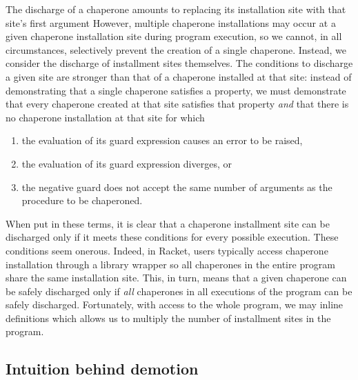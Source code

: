 \documentclass{sigplanconf}
\begin{document}
The discharge of a chaperone amounts to replacing its installation site with that site's first argument
However, multiple chaperone installations may occur at a given chaperone installation site during program execution, so we cannot, in all circumstances, selectively prevent the creation of a single chaperone.
Instead, we consider the discharge of installment sites themselves.
The conditions to discharge a given site are stronger than that of a chaperone installed at that site: instead of demonstrating that a single chaperone satisfies a property, we must demonstrate that every chaperone created at that site satisfies that property \emph{and} that there is no chaperone installation at that site for which
\begin{enumerate}
\item the evaluation of its guard expression causes an error to be raised,
\item the evaluation of its guard expression diverges, or
\item the negative guard does not accept the same number of arguments as the procedure to be chaperoned.
\end{enumerate}

When put in these terms, it is clear that a chaperone installment site can be discharged only if it meets these conditions for every possible execution.
These conditions seem onerous.
Indeed, in Racket, users typically access chaperone installation through a library wrapper so all chaperones in the entire program share the same installation site.
This, in turn, means that a given chaperone can be safely discharged only if \emph{all} chaperones in all executions of the program can be safely discharged.
Fortunately, with access to the whole program, we may inline definitions which allows us to multiply the number of installment sites in the program.


\subsection{Intuition behind demotion}
\end{document}
